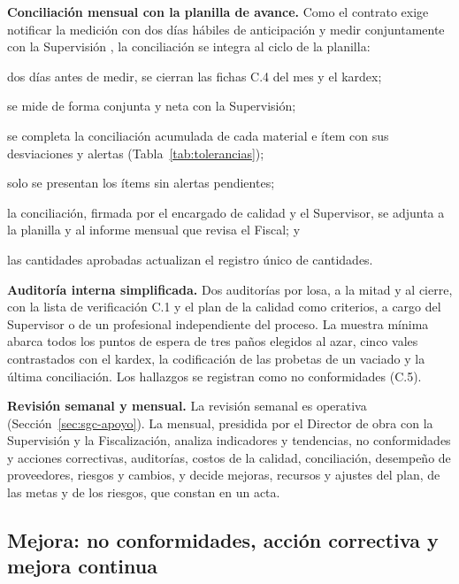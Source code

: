 \textbf{Conciliación mensual con la planilla de avance.} Como el contrato exige notificar la medición con dos días hábiles de anticipación y medir conjuntamente con la Supervisión \parencite[p.~99]{uatf2025pao2}, la conciliación se integra al ciclo de la planilla:
\begin{enumerate*}[label=(\arabic*)]
  \item dos días antes de medir, se cierran las fichas C.4 del mes y el kardex;
  \item se mide de forma conjunta y neta con la Supervisión;
  \item se completa la conciliación acumulada de cada material e ítem con sus desviaciones y alertas (Tabla~\ref{tab:tolerancias});
  \item solo se presentan los ítems sin alertas pendientes;
  \item la conciliación, firmada por el encargado de calidad y el Supervisor, se adjunta a la planilla y al informe mensual que revisa el Fiscal; y
  \item las cantidades aprobadas actualizan el registro único de cantidades.
\end{enumerate*}

\textbf{Auditoría interna simplificada.} Dos auditorías por losa, a la mitad y al cierre, con la lista de verificación C.1 y el plan de la calidad como criterios, a cargo del Supervisor o de un profesional independiente del proceso. La muestra mínima abarca todos los puntos de espera de tres paños elegidos al azar, cinco vales contrastados con el kardex, la codificación de las probetas de un vaciado y la última conciliación. Los hallazgos se registran como no conformidades (C.5).

\textbf{Revisión semanal y mensual.} La revisión semanal es operativa (Sección~\ref{sec:sgc-apoyo}). La mensual, presidida por el Director de obra con la Supervisión y la Fiscalización, analiza indicadores y tendencias, no conformidades y acciones correctivas, auditorías, costos de la calidad, conciliación, desempeño de proveedores, riesgos y cambios, y decide mejoras, recursos y ajustes del plan, de las metas y de los riesgos, que constan en un acta.

\subsection{Mejora: no conformidades, acción correctiva y mejora continua}
\label{sec:sgc-mejora}

